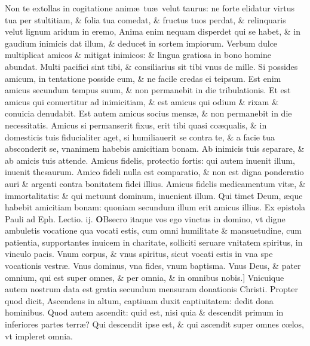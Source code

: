 \documentclass[a5paper,10pt]{book}
\def\leftmarginnote{%
	\lrmarginnote{\hskip -\marginparsep \hskip -6.5em}}
\def\ae{æ}
\def\oe{œ}
\begin{document}
\begin{multicols*}{2}
Non te extollas in cogitatione anim\ae \ tu\ae \ velut taurus: ne forte elidatur virtus tua per stultitiam, \& folia tua comedat, \& fructus tuos perdat, \& relinquaris velut lignum aridum in eremo, Anima enim nequam disperdet qui se habet, \& in gaudium inimicis dat illum, \& deducet in sortem impiorum.
Verbum dulce multiplicat amicos \& mitigat inimicos: \& lingua gratiosa in bono homine abundat.
Multi pacifici sint tibi, \& consiliarius sit tibi vnus de mille. Si possides amicum, in tentatione posside eum, \& ne facile credas ei teipsum.
Est enim amicus secundum tempus suum, \& non permanebit in die tribulationis. Et est amicus qui conuertitur ad inimicitiam, \& est amicus qui odium \& rixam \& conuicia denudabit. Est autem amicus socius mens\ae , \& non permanebit in die necessitatis.
Amicus si permanserit fixus, erit tibi quasi co\ae qualis, \& in domesticis tuis fiducialiter aget, si humiliauerit se contra te, \& a facie tua absconderit se, vnanimem habebis amicitiam bonam.
Ab inimicis tuis separare, \& ab amicis tuis attende. Amicus fidelis, protectio fortis: qui autem inuenit illum, inuenit thesaurum.
Amico fideli nulla est comparatio, \& non est digna ponderatio auri \& argenti contra bonitatem fidei illius.
Amicus fidelis medicamentum vit\ae , \& immortalitatis: \& qui metuunt dominum, inuenient illum. Qui timet Deum, \ae que habebit amicitiam bonam: quoniam secundum illum erit amicus illius.
\newline {} \color{red} Ex epistola Pauli ad Eph. \hfill Lectio. ij. \color{black}
\vspace{-2.25em}
\lettrine[lines=2]{\bfseries \color{red} O}{}\textdagger Bsecro\leftmarginnote{\begin{flushright}c.4.a\end{flushright}} itaque vos ego vinctus in domino, vt digne ambuletis vocatione qua vocati estis, cum omni humilitate \& mansuetudine, cum patientia, supportantes inuicem in charitate, solliciti seruare vnitatem spiritus, in vinculo pacis.
Vnum corpus, \& vnus spiritus, sicut vocati estis in vna spe vocationis vestr\ae . Vnus dominus, vna fides, vnum baptisma.
Vnus Deus, \& pater omnium, qui est super omnes, \& per omnia, \& in omnibus\leftmarginnote{\begin{flushright}B\end{flushright}} nobis.]
Vnicuique autem nostrum data est gratia secundum mensuram donationis Christi. Propter quod dicit, Ascendens in altum, captiuam duxit captiuitatem: dedit dona hominibus.
Quod autem ascendit: quid est, nisi quia \& descendit primum in inferiores partes terr\ae ? Qui descendit ipse est, \& qui ascendit super omnes c\oe los, vt impleret omnia.

\end{multicols*}
\end{document}
